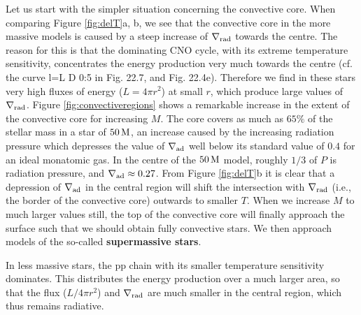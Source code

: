 \documentclass[a4paper,10pt]{article}
\begin{document}
{\noindent}Let us start with the simpler situation concerning the convective core. When comparing Figure \ref{fig:delT}a, b, we see that the convective core in the more massive models is caused by a steep increase of $\nabla_{\rm rad}$ towards the centre. The reason for this is that the dominating CNO cycle, with its extreme temperature sensitivity, concentrates the energy production very much towards the centre (cf. the curve l=L D 0:5 in Fig. 22.7, and Fig. 22.4e). Therefore we find in these stars very high fluxes of energy ($L=4\pi r^2$) at small $r$, which produce large values of $\nabla_{\rm rad}$. Figure \ref{fig:convectiveregions} shows a remarkable increase in the extent of the convective core for increasing $M$. The core covers as much as $65\%$ of the stellar mass in a star of $50\,{\rm M}$, an increase caused by the increasing radiation pressure which depresses the value of $\nabla_{\rm ad}$ well below its standard value of $0.4$ for an ideal monatomic gas. In the centre of the $50\,{\rm M}$ model, roughly $1/3$ of $P$ is radiation pressure, and $\nabla_{\rm ad}\approx0.27$. From Figure \ref{fig:delT}b it is clear that a depression of $\nabla_{\rm ad}$ in the central region will shift the intersection with $\nabla_{\rm rad}$ (i.e., the border of the convective core) outwards to smaller $T$. When we increase $M$ to much larger values still, the top of the convective core will finally approach the surface such that we should obtain fully convective stars. We then approach models of the so-called \textbf{supermassive stars}.

{\noindent}In less massive stars, the pp chain with its smaller temperature sensitivity dominates. This distributes the energy production over a much larger area, so that the flux ($L/4\pi r^2$) and $\nabla_{\rm rad}$ are much smaller in the central region, which thus remains radiative.
\end{document}
